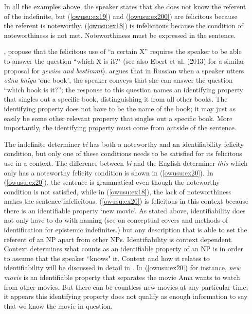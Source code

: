 \documentclass[output=paper,modfonts,nonflat,draftmode]{langsci/langscibook}
\begin{document}
\z
\z

In all the examples above, the speaker states that she does not know the referent of the indefinite, but (\ref{owusu:ex19}) and (\ref{owusu:ex200}) are felicitous because the referent is noteworthy. (\ref{owusu:ex18}) is infelicitous because the condition of noteworthiness is not met. Noteworthiness must be expressed in the sentence.

\citet{AbuschRooth1997}, propose that the felicitous use of  ``a certain X” requires the speaker to be able to answer the question ``which X is it?" (see also Ebert et al. (2013) for a similar proposal for \emph{gewiss and bestimmt}). \citet{Aloni2001} argues that in Russian when a  speaker utters \emph{odna kniga} `one book', the speaker conveys that she can answer the question ``which book is it?”; the response to this question names an identifying property that singles out a specific book, distinguishing it from all other books. The identifying property does not have to be the name of the book; it may just as easily be some other relevant property that singles out a specific book. More importantly, the identifying property must come from outside of the sentence.


The indefinite determiner \emph{bi} has both a noteworthy and an identifiability felicity condition, but only one of these conditions needs to be satisfied for its felicitous use in a context. The difference between \emph{bi} and the English determiner \emph{this} which only has a noteworthy felicity condition is shown in (\ref{owusu:ex20}). In  (\ref{owusu:ex20}), the sentence is grammatical even though the noteworthy condition is not satisfied, while in (\ref{owusu:ex18}), the lack of noteworthiness makes the sentence infelicitous. (\ref{owusu:ex20}) is felicitous in this context because there is an identifiable property `new movie'. As stated above, identifiability does not only have to do with naming (see \citet{AloniPort2015} on conceptual covers and methods of identification for epistemic indefinites.) but any description that is able to set the referent of an NP apart from other NPs. Identifiability is context dependent. Context determines what counts as an identifiable property of an NP is in order to assume that the speaker ``knows" it. Context and how it relates to identifiability will be discussed in detail in . In (\ref{owusu:ex20}) for instance, \emph{new movie} is an identifiable property that separates the movie Ama wants to watch from other movies.  But there can be countless new movies at any particular time; it appears this identifying property does not qualify as enough information to say that we know the movie in question. 
\end{document}
